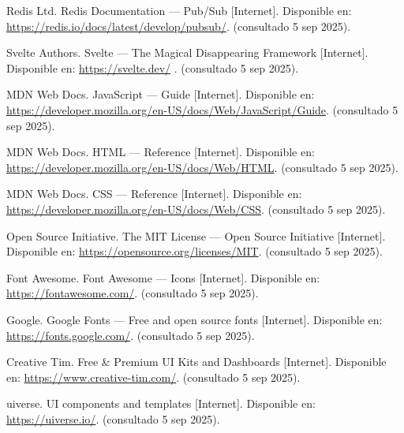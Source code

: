 \documentclass[12pt, a4paper]{article}
\begin{document}
\begin{thebibliography}{9}
Redis Ltd. Redis Documentation — Pub/Sub [Internet]. 
Disponible en: \url{https://redis.io/docs/latest/develop/pubsub/}. (consultado 5 sep 2025).
	
	

Svelte Authors. Svelte — The Magical Disappearing Framework [Internet]. 
Disponible en: \url{https://svelte.dev/} . (consultado 5 sep 2025).

MDN Web Docs. JavaScript — Guide [Internet]. 
Disponible en: \url{https://developer.mozilla.org/en-US/docs/Web/JavaScript/Guide}. (consultado 5 sep 2025).

MDN Web Docs. HTML — Reference [Internet]. 
Disponible en: \url{https://developer.mozilla.org/en-US/docs/Web/HTML}. (consultado 5 sep 2025).

MDN Web Docs. CSS — Reference [Internet]. 
Disponible en: \url{https://developer.mozilla.org/en-US/docs/Web/CSS}. (consultado 5 sep 2025).

Open Source Initiative. The MIT License — Open Source Initiative [Internet]. 
Disponible en: \url{https://opensource.org/licenses/MIT}. (consultado 5 sep 2025).

Font Awesome. Font Awesome — Icons [Internet]. 
Disponible en: \url{https://fontawesome.com/}. (consultado 5 sep 2025).

Google. Google Fonts — Free and open source fonts [Internet]. 
Disponible en: \url{https://fonts.google.com/}. (consultado 5 sep 2025).

Creative Tim. Free \& Premium UI Kits and Dashboards [Internet]. 
Disponible en: \url{https://www.creative-tim.com/}. (consultado 5 sep 2025).

uiverse. UI components and templates [Internet]. 
Disponible en: \url{https://uiverse.io/}. (consultado 5 sep 2025).

\end{thebibliography}
\end{document}
